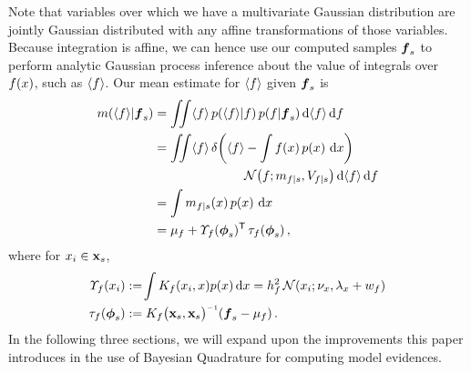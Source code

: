 \documentclass{article}
\begin{document}
Note that variables over which we have a multivariate Gaussian distribution are jointly Gaussian distributed with any affine transformations of those variables. Because integration is affine, we can hence use our computed samples $\vf_s$ to perform analytic Gaussian process inference about the value of integrals over $f(\lfv)$, such as $\inty{f}$. Our mean estimate for $\inty{f}$ given $\vf_s$ is
%
\begin{align} \label{eq:mean_inty_f}
\mean{\inty{f}}{\vf_s}
& 
=\iint \inty{f}\,\p{\inty{f}}{f}\p{f}{\vf_s} \ud \inty{f} \,\ud f                                                                                                                                                               \nonumber\\
&
 =\iint \inty{f}\,\dd{\inty{f}}{\int f(\lfv)\,\po{\lfv}\,\ud\lfv}
\nonumber\\
&\hspace{2.5cm}
\N{f}{\meancondfn{f}{s}}{\covcondfn{f}{s}} \ud \inty{f} \,\ud f \nonumber\\
&
 = \int \meancondfn{f}{s}(\lfv)\,\po{\lfv}\,\ud\lfv\nonumber\\
&
 = 
\mu_f + \ntT{s}{f}\, \dtt{s}{f}
\,,
\end{align}
where for $\lfv_i \in \vlfv_s$,
\begin{align*}
\fnt{\lfv_i}{f} & \deq \!\int K_f(\lfv_i,\lfv)\po{\lfv}\ud\lfv
 = h_f^2\,\N{\lfv_i}{\nu_{\lfv}}{\lambda_{\lfv}+w_{f}}\\
\dtt{s}{f} & \deq K_{f}\bigl(\vlfv_s,\vlfv_s\bigr)\inv (\vf_s-{\mu}_{f})\,.
\end{align*}
%
%
In the following three sections, we will expand upon the improvements this paper introduces in the use of Bayesian Quadrature for computing model evidences.
\end{document}
